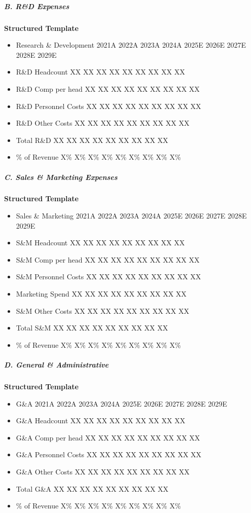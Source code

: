 \documentclass[11pt]{article}
\begin{document}
\subparagraph{B. R\&D Expenses}\mbox{}\par
\textbf{Structured Template}
\begin{itemize}[leftmargin=*,itemsep=2pt,topsep=2pt]
\item {} Research \& Development 2021A 2022A 2023A 2024A 2025E 2026E 2027E 2028E 2029E
\item {} R\&D Headcount XX XX XX XX XX XX XX XX XX
\item {} R\&D Comp per head XX XX XX XX XX XX XX XX XX
\item {} R\&D Personnel Costs XX XX XX XX XX XX XX XX XX
\item {} R\&D Other Costs XX XX XX XX XX XX XX XX XX
\item {} Total R\&D XX XX XX XX XX XX XX XX XX
\item {} \% of Revenue X\% X\% X\% X\% X\% X\% X\% X\% X\%
\end{itemize}

\subparagraph{C. Sales \& Marketing Expenses}\mbox{}\par
\textbf{Structured Template}
\begin{itemize}[leftmargin=*,itemsep=2pt,topsep=2pt]
\item {} Sales \& Marketing 2021A 2022A 2023A 2024A 2025E 2026E 2027E 2028E 2029E
\item {} S\&M Headcount XX XX XX XX XX XX XX XX XX
\item {} S\&M Comp per head XX XX XX XX XX XX XX XX XX
\item {} S\&M Personnel Costs XX XX XX XX XX XX XX XX XX
\item {} Marketing Spend XX XX XX XX XX XX XX XX XX
\item {} S\&M Other Costs XX XX XX XX XX XX XX XX XX
\item {} Total S\&M XX XX XX XX XX XX XX XX XX
\item {} \% of Revenue X\% X\% X\% X\% X\% X\% X\% X\% X\%
\end{itemize}

\subparagraph{D. General \& Administrative}\mbox{}\par
\textbf{Structured Template}
\begin{itemize}[leftmargin=*,itemsep=2pt,topsep=2pt]
\item {} G\&A 2021A 2022A 2023A 2024A 2025E 2026E 2027E 2028E 2029E
\item {} G\&A Headcount XX XX XX XX XX XX XX XX XX
\item {} G\&A Comp per head XX XX XX XX XX XX XX XX XX
\item {} G\&A Personnel Costs XX XX XX XX XX XX XX XX XX
\item {} G\&A Other Costs XX XX XX XX XX XX XX XX XX
\item {} Total G\&A XX XX XX XX XX XX XX XX XX
\item {} \% of Revenue X\% X\% X\% X\% X\% X\% X\% X\% X\%
\end{itemize}
\end{document}

